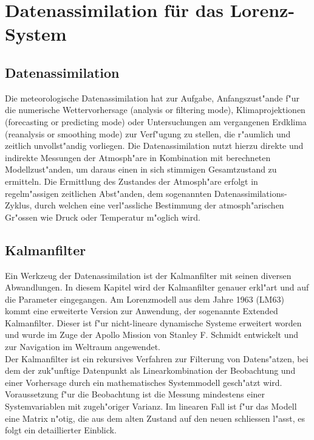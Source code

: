 %
%
%
\chapter{Datenassimilation für das Lorenz-System\label{chapter:kalman}}
\begin{refsection}

\section{Datenassimilation}
Die meteorologische Datenassimilation hat zur Aufgabe, Anfangszust"ande f"ur die numerische Wettervorhersage (analysis or filtering mode), Klimaprojektionen (forecasting or predicting mode) oder Untersuchungen am vergangenen Erdklima (reanalysis or smoothing mode) zur Verf"ugung zu stellen, die r"aumlich und zeitlich unvollst"andig vorliegen. Die Datenassimilation nutzt hierzu direkte und indirekte Messungen der Atmosph"are in Kombination mit berechneten Modellzust"anden, um daraus einen in sich stimmigen Gesamtzustand zu ermitteln. Die Ermittlung des Zustandes der Atmosph"are erfolgt in regelm"assigen zeitlichen Abst"anden, dem sogenannten Datenassimilations-Zyklus, durch welchen eine verl"assliche Bestimmung der atmosph"arischen Gr"ossen wie Druck oder Temperatur m"oglich wird.

\section{Kalmanfilter}
Ein Werkzeug der Datenassimilation ist der Kalmanfilter mit seinen diversen Abwandlungen. In diesem Kapitel wird der Kalmanfilter genauer erkl"art und auf die Parameter eingegangen. Am Lorenzmodell aus dem Jahre 1963 (LM63) kommt eine erweiterte Version zur Anwendung, der sogenannte Extended Kalmanfilter. Dieser ist f"ur nicht-lineare dynamische Systeme erweitert worden und wurde im Zuge der Apollo Mission von Stanley F. Schmidt entwickelt und zur Navigation im Weltraum angewendet.\cite{skript:NASAKalman}\\

Der Kalmanfilter ist ein rekursives Verfahren zur Filterung von Datens"atzen, bei dem  der zuk"unftige Datenpunkt als Linearkombination der Beobachtung und einer Vorhersage durch ein mathematisches Systemmodell gesch"atzt wird. Voraussetzung f"ur die Beobachtung ist die Messung mindestens einer Systemvariablen mit zugeh"origer Varianz. Im linearen Fall ist f"ur das Modell eine Matrix n"otig, die aus dem alten Zustand auf den neuen schliessen l"asst, es folgt ein detaillierter Einblick.\cite{skript:WRStat}\\


\end{refsection}
